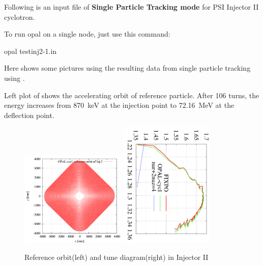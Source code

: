 Following is an input file of {\bfseries Single Particle Tracking mode} for PSI Injector II cyclotron.


To run opal on a single node, just use this command:
\begin{example}
 opal testinj2-1.in
\end{example}

Here shows some pictures using the resulting data from single particle tracking using \opalcycl.

Left plot of  shows the accelerating orbit of reference particle. After 106 turns, the energy increases from \SI{870}{\kilo\electronvolt} at the injection point to \SI{72.16}{\mega\electronvolt} at the deflection point.

\begin{figure}[tb]
\centering
   \includegraphics[width=0.45\textwidth]{figures/cyclotron/AEO_Injector2.png}
   \includegraphics[width=0.40\textwidth,angle=90]{figures/cyclotron/nurnuz_Inj2}
   \caption{Reference orbit(left) and tune diagram(right) in Injector II  }
   \label{fig:Inj2 reference orbit and tune}
\end{figure}


